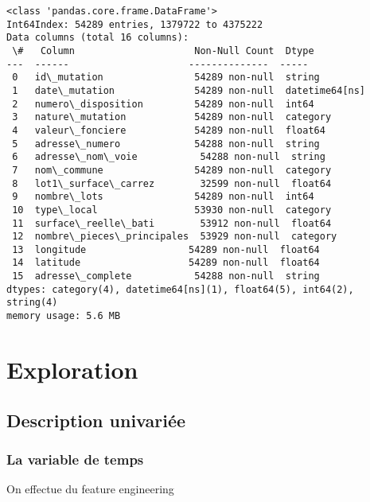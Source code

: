 \documentclass[11pt]{article}
\begin{document}
    \begin{Verbatim}[commandchars=\\\{\}]
<class 'pandas.core.frame.DataFrame'>
Int64Index: 54289 entries, 1379722 to 4375222
Data columns (total 16 columns):
 \#   Column                     Non-Null Count  Dtype
---  ------                     --------------  -----
 0   id\_mutation                54289 non-null  string
 1   date\_mutation              54289 non-null  datetime64[ns]
 2   numero\_disposition         54289 non-null  int64
 3   nature\_mutation            54289 non-null  category
 4   valeur\_fonciere            54289 non-null  float64
 5   adresse\_numero             54288 non-null  string
 6   adresse\_nom\_voie           54288 non-null  string
 7   nom\_commune                54289 non-null  category
 8   lot1\_surface\_carrez        32599 non-null  float64
 9   nombre\_lots                54289 non-null  int64
 10  type\_local                 53930 non-null  category
 11  surface\_reelle\_bati        53912 non-null  float64
 12  nombre\_pieces\_principales  53929 non-null  category
 13  longitude                  54289 non-null  float64
 14  latitude                   54289 non-null  float64
 15  adresse\_complete           54288 non-null  string
dtypes: category(4), datetime64[ns](1), float64(5), int64(2), string(4)
memory usage: 5.6 MB
    \end{Verbatim}

    \hypertarget{exploration}{%
\section{Exploration}\label{exploration}}

\hypertarget{description-univariuxe9e}{%
\subsection{Description univariée}\label{description-univariuxe9e}}

\hypertarget{la-variable-de-temps}{%
\subsubsection{La variable de temps}\label{la-variable-de-temps}}

On effectue du feature engineering
\end{document}
